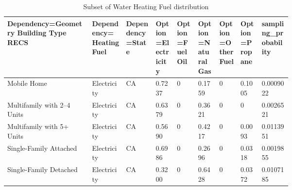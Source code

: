 \begin{table}
    \centering
    \scriptsize
    \begin{tabular}{p{0.2\linewidth}p{0.08\linewidth}p{0.075\linewidth}|
p{0.05\linewidth}p{0.05\linewidth}p{0.05\linewidth}p{0.05\linewidth}p{0.05\linewidth}p{0.075\linewidth}}
    \hline
    Dependency=Geometry Building Type RECS & Dependency=\newline Heating Fuel & Dependency=\newline State & Option=\newline Electricity  & Option=\newline Fuel Oil & Option=\newline Natural Gas & Option=\newline Other Fuel & Option=\newline Propane & sampling\newline \_probability \\
    \hline
    Mobile Home & Electricity & CA & 0.7237 & 0 & 0.1759 & 0 & 0.1005 & 0.0009022 \\
    Multifamily with 2--4 Units & Electricity & CA & 0.6379 & 0 & 0.3621 & 0 & 0 & 0.0026521 \\
    Multifamily with 5+ Units & Electricity & CA & 0.5690 & 0 & 0.4217 & 0 & 0.0093 & 0.0113951 \\
    Single-Family Attached & Electricity & CA & 0.6986 & 0 & 0.2696 & 0 & 0.0318 & 0.0019855 \\
    Single-Family Detached & Electricity & CA & 0.3200 & 0 & 0.6428 & 0 & 0.0372 & 0.0107185 \\
    \hline
    \end{tabular}
    \caption{Subset of Water Heating Fuel distribution}
    \label{tab:ex_whf_distr}
\end{table}


